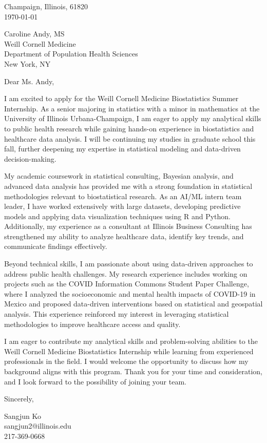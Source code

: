 \documentclass[11pt]{article}
\begin{document}
\noindent
Champaign, Illinois, 61820 \\
\today
\vspace{2em}

\noindent
Caroline Andy, MS \\
Weill Cornell Medicine \\
Department of Population Health Sciences \\
New York, NY \\

\vspace{1.5em}

Dear Ms. Andy,

I am excited to apply for the Weill Cornell Medicine Biostatistics Summer Internship. As a senior majoring in statistics with a minor in mathematics at the University of Illinois Urbana-Champaign, I am eager to apply my analytical skills to public health research while gaining hands-on experience in biostatistics and healthcare data analysis. I will be continuing my studies in graduate school this fall, further deepening my expertise in statistical modeling and data-driven decision-making.

My academic coursework in statistical consulting, Bayesian analysis, and advanced data analysis has provided me with a strong foundation in statistical methodologies relevant to biostatistical research. As an AI/ML intern team leader, I have worked extensively with large datasets, developing predictive models and applying data visualization techniques using R and Python. Additionally, my experience as a consultant at Illinois Business Consulting has strengthened my ability to analyze healthcare data, identify key trends, and communicate findings effectively.

Beyond technical skills, I am passionate about using data-driven approaches to address public health challenges. My research experience includes working on projects such as the COVID Information Commons Student Paper Challenge, where I analyzed the socioeconomic and mental health impacts of COVID-19 in Mexico and proposed data-driven interventions based on statistical and geospatial analysis. This experience reinforced my interest in leveraging statistical methodologies to improve healthcare access and quality.

I am eager to contribute my analytical skills and problem-solving abilities to the Weill Cornell Medicine Biostatistics Internship while learning from experienced professionals in the field. I would welcome the opportunity to discuss how my background aligns with this program. Thank you for your time and consideration, and I look forward to the possibility of joining your team.


\vspace{1em}

Sincerely,

\vspace{2em}

\noindent
Sangjun Ko\\
sangjun2@illinois.edu\\
217-369-0668
\end{document}
